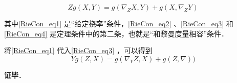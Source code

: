 \begin{equation}\label{RieCon_eq4}
Zg(X, Y)=g(\nabla_ZX, Y)+g(X, \nabla_ZY)
\end{equation}


其中\autoref{RieCon_eq1} 是“给定挠率”条件，\autoref{RieCon_eq2} 、\autoref{RieCon_eq3} 和\autoref{RieCon_eq4} 是定理条件中的第二条，也就是“和黎曼度量相容”条件．

将\autoref{RieCon_eq1} 代入\autoref{RieCon_eq3} ，可以得到
\begin{equation}
Yg(Z, X)=g(\nabla_YZ, X)+g(Z, \nabla))
\end{equation}

\textbf{证毕}．



